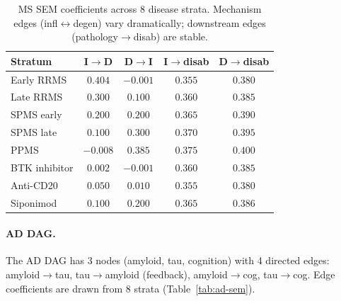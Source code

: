 \documentclass[11pt]{article}
\begin{document}
\begin{table}[h]
\centering
\caption{MS SEM coefficients across 8 disease strata. Mechanism edges (infl$\leftrightarrow$degen) vary dramatically; downstream edges (pathology$\to$disab) are stable.}
\label{tab:ms-sem}
\small
\begin{tabular}{@{}lcccc@{}}
\toprule
\textbf{Stratum} & \textbf{I$\to$D} & \textbf{D$\to$I} & \textbf{I$\to$disab} & \textbf{D$\to$disab} \\
\midrule
Early RRMS & $0.404$ & $-0.001$ & $0.355$ & $0.380$ \\
Late RRMS & $0.300$ & $0.100$ & $0.360$ & $0.385$ \\
SPMS early & $0.200$ & $0.200$ & $0.365$ & $0.390$ \\
SPMS late & $0.100$ & $0.300$ & $0.370$ & $0.395$ \\
PPMS & $-0.008$ & $0.385$ & $0.375$ & $0.400$ \\
BTK inhibitor & $0.002$ & $-0.001$ & $0.360$ & $0.385$ \\
Anti-CD20 & $0.050$ & $0.010$ & $0.355$ & $0.380$ \\
Siponimod & $0.100$ & $0.200$ & $0.365$ & $0.386$ \\
\bottomrule
\end{tabular}
\end{table}

\paragraph{AD DAG.}
The AD DAG has 3 nodes (amyloid, tau, cognition) with 4 directed edges: amyloid$\to$tau, tau$\to$amyloid (feedback), amyloid$\to$cog, tau$\to$cog. Edge coefficients are drawn from 8 strata (Table~\ref{tab:ad-sem}).
\end{document}
